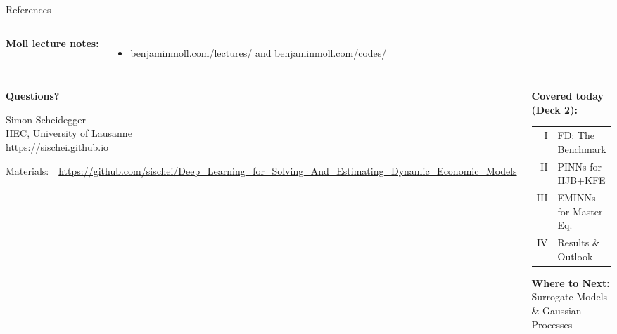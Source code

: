\documentclass[aspectratio=169,11pt]{beamer}
\begin{document}
\begin{frame}{References}
\begin{columns}[T]
\vspace{0.1em}
\textbf{Moll lecture notes:}
\begin{itemize}\itemsep0pt
    \item \url{benjaminmoll.com/lectures/} and \url{benjaminmoll.com/codes/}
\end{itemize}
\end{columns}
\end{frame}

\begin{frame}{}
\begin{columns}[c]
\begin{center}
{\Huge \textcolor{uzhblue}{\textbf{Questions?}}}

\vspace{1.0cm}
{\large Simon Scheidegger}\\[4pt]
{\small HEC, University of Lausanne}\\[4pt]
\url{https://sischei.github.io}

\vspace{0.6cm}
{\small Materials:~~\url{https://github.com/sischei/Deep_Learning_for_Solving_And_Estimating_Dynamic_Economic_Models}}
\end{center}

\begin{center}
\textbf{Covered today (Deck 2):}\\[8pt]
{\small
\begin{tabular}{rl}
I & FD: The Benchmark \\
II & PINNs for HJB+KFE \\
III & EMINNs for Master Eq. \\
IV & Results \& Outlook \\
\end{tabular}
}

\vspace{0.8cm}
\textbf{Where to Next:}\\[6pt]
{\large Surrogate Models}\\
{\large \& Gaussian Processes}\\[8pt]
\end{center}
\end{columns}
\end{frame}
\end{document}
